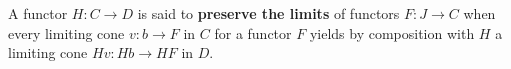 A functor $H: C \rightarrow D$ is said to \textbf{preserve the limits} of functors $F: J \rightarrow C$ when every limiting cone $v: b \rightarrow F$ in $C$ for a functor $F$ yields by composition with $H$ a limiting cone $Hv: Hb \rightarrow HF$ in $D$.

